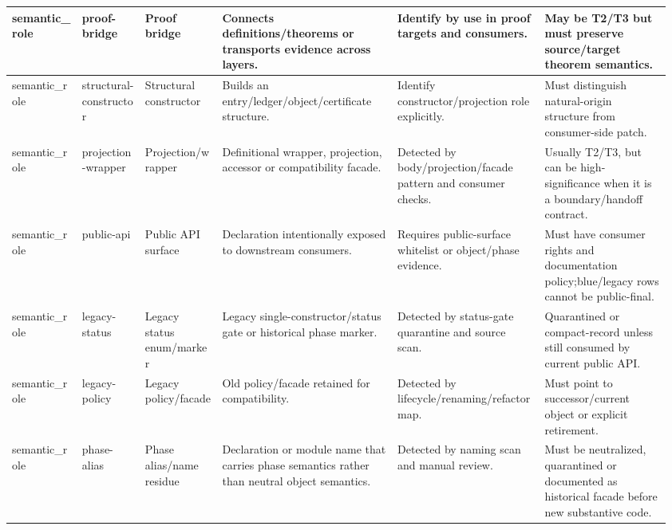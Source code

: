 \begin{longtable}{L{0.105\linewidth} L{0.095\linewidth} L{0.11\linewidth} L{0.255\linewidth} L{0.215\linewidth} L{0.185\linewidth}}
\hline
\addlinespace[0.24em]
semantic\_role & proof-bridge & Proof bridge & Connects definitions/\allowbreak{}theorems or transports evidence across layers. & Identify by use in proof targets and consumers. & May be T2/\allowbreak{}T3 but must preserve source/\allowbreak{}target theorem semantics.\\
\hline
\addlinespace[0.24em]
semantic\_role & structural-constructor & Structural constructor & Builds an entry/\allowbreak{}ledger/\allowbreak{}object/\allowbreak{}certificate structure. & Identify constructor/\allowbreak{}projection role explicitly. & Must distinguish natural-origin structure from consumer-side patch.\\
\hline
\addlinespace[0.24em]
semantic\_role & projection-wrapper & Projection/\allowbreak{}wrapper & Definitional wrapper, projection, accessor or compatibility facade. & Detected by body/\allowbreak{}projection/\allowbreak{}facade pattern and consumer checks. & Usually T2/\allowbreak{}T3, but can be high-significance when it is a boundary/\allowbreak{}handoff contract.\\
\hline
\addlinespace[0.24em]
semantic\_role & public-api & Public API surface & Declaration intentionally exposed to downstream consumers. & Requires public-surface whitelist or object/\allowbreak{}phase evidence. & Must have consumer rights and documentation policy;\newline blue/\allowbreak{}legacy rows cannot be public-final.\\
\hline
\addlinespace[0.24em]
semantic\_role & legacy-status & Legacy status enum/\allowbreak{}marker & Legacy single-constructor/\allowbreak{}status gate or historical phase marker. & Detected by status-gate quarantine and source scan. & Quarantined or compact-record unless still consumed by current public API.\\
\hline
\addlinespace[0.24em]
semantic\_role & legacy-policy & Legacy policy/\allowbreak{}facade & Old policy/\allowbreak{}facade retained for compatibility. & Detected by lifecycle/\allowbreak{}renaming/\allowbreak{}refactor map. & Must point to successor/\allowbreak{}current object or explicit retirement.\\
\hline
\addlinespace[0.24em]
semantic\_role & phase-alias & Phase alias/\allowbreak{}name residue & Declaration or module name that carries phase semantics rather than neutral object semantics. & Detected by naming scan and manual review. & Must be neutralized, quarantined or documented as historical facade before new substantive code.\\

\end{longtable}
